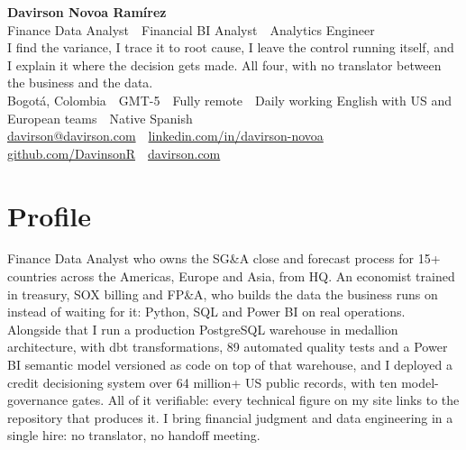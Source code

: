 \documentclass[a4paper,10pt]{article}
\begin{document}
\begin{center}
  {\LARGE\bfseries\color{ink} Davirson Novoa Ramírez}\\[3pt]
  {\large\color{cold} Finance Data Analyst \,\textperiodcentered\, Financial BI Analyst \,\textperiodcentered\, Analytics Engineer}\\[4pt]
  {\small I find the variance, I trace it to root cause, I leave the control running itself, and I explain it where the decision gets made. All four, with no translator between the business and the data.}\\[3pt]
  {\small Bogotá, Colombia \,\textperiodcentered\, GMT-5 \,\textperiodcentered\, Fully remote \,\textperiodcentered\, Daily working English with US and European teams \,\textperiodcentered\, Native Spanish}\\[2pt]
  {\small \href{mailto:davirson@davirson.com}{davirson@davirson.com} \,\textperiodcentered\, \href{https://linkedin.com/in/davirson-novoa}{linkedin.com/in/davirson-novoa} \,\textperiodcentered\, \href{https://github.com/DavinsonR}{github.com/DavinsonR} \,\textperiodcentered\, \href{https://davirson.com/en}{davirson.com}}
\end{center}
\vspace{2pt}

\section*{Profile}
Finance Data Analyst who owns the SG\&A close and forecast process for 15+ countries across the Americas, Europe and Asia, from HQ. An economist trained in treasury, SOX billing and FP\&A, who builds the data the business runs on instead of waiting for it: Python, SQL and Power BI on real operations. Alongside that I run a production PostgreSQL warehouse in medallion architecture, with dbt transformations, 89 automated quality tests and a Power BI semantic model versioned as code on top of that warehouse, and I deployed a credit decisioning system over 64 million+ US public records, with ten model-governance gates. All of it verifiable: every technical figure on my site links to the repository that produces it. I bring financial judgment and data engineering in a single hire: no translator, no handoff meeting.
\end{document}

